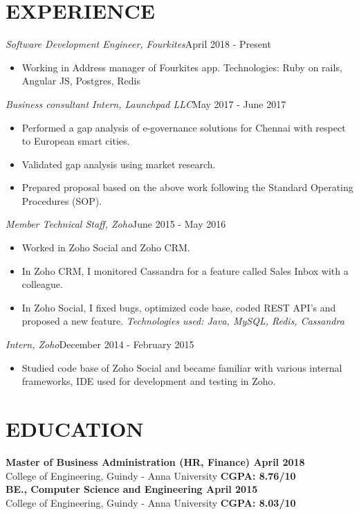 \documentclass[11pt,a4paper]{article}
\begin{document}
\section*{EXPERIENCE}
\emph{Software Development Engineer, Fourkites}{\hfill April 2018 - Present}
\begin{itemize}[noitemsep]
\item Working in Address manager of Fourkites app. Technologies: Ruby on rails, Angular JS, Postgres, Redis
\end{itemize}
\emph{Business consultant Intern, Launchpad LLC}{\hfill May 2017 -  June 2017}
\begin{itemize}[noitemsep]
\item Performed a gap analysis of e-governance solutions for Chennai with respect to European smart cities.
\item Validated gap analysis using market research.
\item Prepared proposal based on the above work following the Standard Operating Procedures (SOP).
\end{itemize}
\emph{Member Technical Staff, Zoho}{\hfill June 2015 - May 2016}
\begin{itemize}[noitemsep]
\item Worked in Zoho Social and Zoho CRM.
\item In Zoho CRM, I monitored Cassandra for a feature called Sales Inbox with a colleague.
\item In Zoho Social, I fixed bugs, optimized code base, coded REST API's and proposed a new feature. \emph {Technologies used: Java, MySQL, Redis, Cassandra}
\end{itemize}
\emph{Intern, Zoho}{\hfill December 2014 - February 2015}
\begin{itemize}[noitemsep]
\item Studied code base of Zoho Social and became familiar with various internal frameworks, IDE used for development and testing in Zoho.
\end{itemize}
\section*{EDUCATION}
\textbf{Master of Business Administration (HR, Finance) {\hfill April 2018}}\\
College of Engineering, Guindy - Anna University {\hfill \textbf{CGPA: 8.76/10}}\\
\textbf{BE., Computer Science and Engineering {\hfill April 2015}}\\
College of Engineering, Guindy - Anna University {\hfill \textbf{CGPA: 8.03/10}}\\
\end{document}
